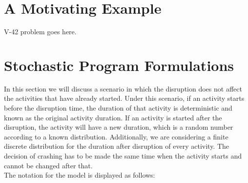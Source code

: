 \documentclass[11pt]{article}
\begin{document}
\section{A Motivating Example}
V-42 problem goes here.

\section{Stochastic Program Formulations} \label{formulation}
In this section we will discuss a scenario in which the disruption does not affect the activities that have already started. Under this scenario, if an activity starts before the disruption time, the duration of that activity is deterministic and known as the original activity duration. If an activity is started after the disruption, the activity will have a new duration, which is a random number according to a known distribution. Additionally, we are considering a finite discrete distribution for the duration after disruption of every activity. The decision of crashing has to be made the same time when the activity starts and cannot be changed after that.\\
\newline The notation for the model is displayed as follows:
\end{document}
